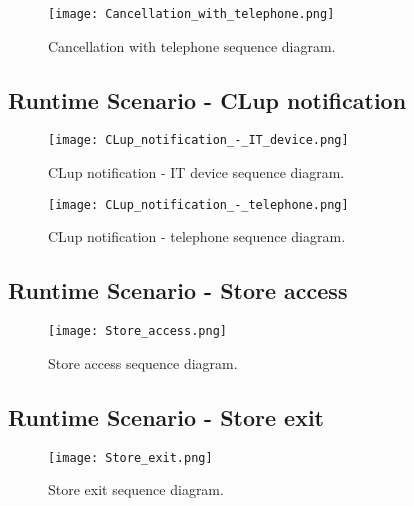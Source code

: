 \documentclass[../../main.tex]{subfiles}
\begin{document}
\begin{figure}[H]
    \centering
    \texttt{[image: Cancellation\_with\_telephone.png]}
    \caption{
        Cancellation with telephone sequence diagram.
    }
\end{figure}

\subsection{Runtime Scenario  - CLup notification}

\begin{figure}[H]
    \centering
    \texttt{[image: CLup\_notification\_-\_IT\_device.png]}
    \caption{
        CLup notification - IT device sequence diagram.
    }
\end{figure}

\begin{figure}[H]
    \centering
    \texttt{[image: CLup\_notification\_-\_telephone.png]}
    \caption{
        CLup notification - telephone sequence diagram.
    }
\end{figure}

\subsection{Runtime Scenario  - Store access}

\begin{figure}[H]
    \centering
    \texttt{[image: Store\_access.png]}
    \caption{
        Store access sequence diagram.
    }
\end{figure}

\subsection{Runtime Scenario  - Store exit}

\begin{figure}[H]
    \centering
    \texttt{[image: Store\_exit.png]}
    \caption{
        Store exit sequence diagram.
    }
\end{figure}
\end{document}
